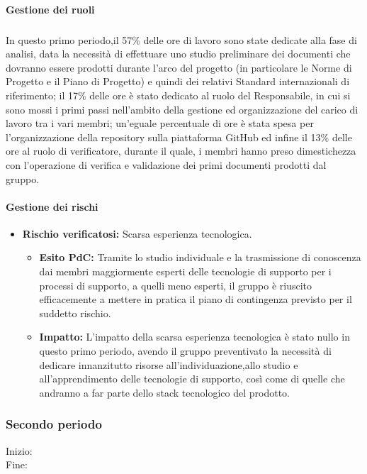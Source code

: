 \paragraph{Gestione dei ruoli} 
\subparagraph{}
In questo primo periodo,il 57\% delle ore di lavoro sono state dedicate alla fase di analisi,
data la necessità di effettuare uno studio preliminare dei documenti che dovranno essere prodotti durante
l'arco del progetto (in particolare le Norme di Progetto e il Piano di Progetto) e quindi dei relativi Standard
internazionali di riferimento; il 17\% delle ore è stato dedicato al ruolo del Responsabile, in cui si sono mossi i primi 
passi nell'ambito della gestione ed organizzazione del carico di lavoro tra i vari membri; un'eguale percentuale di ore 
è stata spesa per l'organizzazione della repository sulla piattaforma GitHub ed infine il 13\% delle ore al ruolo di verificatore,
durante il quale, i membri hanno preso dimestichezza con l'operazione di verifica e validazione dei primi documenti prodotti dal gruppo.

\paragraph{Gestione dei rischi}

\begin{itemize}
\item \textbf{Rischio verificatosi:} Scarsa esperienza tecnologica.
\begin{itemize}
\item \textbf{Esito PdC:} Tramite lo studio individuale e la trasmissione di conoscenza dai membri maggiormente esperti delle tecnologie di supporto
per i processi di supporto, a quelli meno esperti, il gruppo è riuscito efficacemente a mettere in pratica il piano di contingenza previsto per il suddetto
rischio.\\
\item \textbf{Impatto:} L'impatto della scarsa esperienza tecnologica è stato nullo in questo primo periodo,
avendo il gruppo preventivato la necessità di dedicare innanzitutto risorse all'individuazione,allo studio e all'apprendimento
delle tecnologie di supporto, così come di quelle che andranno a far parte dello stack tecnologico del prodotto.\\ 
\end{itemize}
\end{itemize}

\subsubsection{Secondo periodo} 
Inizio: \\
Fine:
